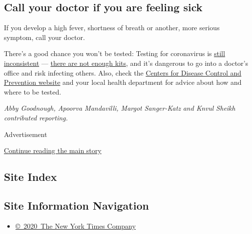 \hypertarget{call-your-doctor-if-you-are-feeling-sick}{%
\subsection{Call your doctor if you are feeling
sick}\label{call-your-doctor-if-you-are-feeling-sick}}

If you develop a high fever, shortness of breath or another, more
serious symptom, call your doctor.

There's a good chance you won't be tested: Testing for coronavirus is
\href{https://www.nytimes3xbfgragh.onion/2020/03/02/health/coronavirus-testing-cdc.html}{still
inconsistent} ---
\href{https://www.nytimes3xbfgragh.onion/2020/03/06/health/testing-coronavirus.html}{there
are not enough kits}, and it's dangerous to go into a doctor's office
and risk infecting others. Also, check the
\href{https://www.cdc.gov/coronavirus/2019-ncov/if-you-are-sick/steps-when-sick.html?CDC_AA_refVal=https\%3A\%2F\%2Fwww.cdc.gov\%2Fcoronavirus\%2F2019-ncov\%2Fabout\%2Fsteps-when-sick.html}{Centers
for Disease Control and Prevention website} and your local health
department for advice about how and where to be tested.

\emph{Abby Goodnough, Apoorva Mandavilli, Margot Sanger-Katz} \emph{and
Knvul Sheikh contributed reporting.}

Advertisement

\protect\hyperlink{after-bottom}{Continue reading the main story}

\hypertarget{site-index}{%
\subsection{Site Index}\label{site-index}}

\hypertarget{site-information-navigation}{%
\subsection{Site Information
Navigation}\label{site-information-navigation}}

\begin{itemize}
\tightlist
\item
  \href{https://help.nytimes3xbfgragh.onion/hc/en-us/articles/115014792127-Copyright-notice}{©~2020~The
  New York Times Company}
\end{itemize}

